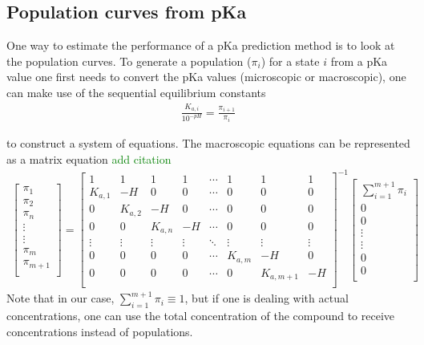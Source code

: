 \documentclass[9pt,lineno,final]{elife}
\begin{document}
\subsection{Population curves from pKa}
One way to estimate the performance of a pKa prediction method is to look at the population curves.
%
To generate a population ($\pi_i$) for a state $i$ from a pKa value one first needs to convert the pKa values (microscopic or macroscopic), one can make use of the sequential equilibrium constants 
%
\begin{align}
 \frac{K_{a,i}}{10^{-pH}} = \frac{\pi_{i+1}}{\pi_{i}}
\end{align}

to construct a system of equations. The macroscopic equations can be represented as a matrix equation \textcolor{green}{add citation}
%
\begin{gather}
\begin{bmatrix} \pi_{1} \\ \pi_{2} \\ \pi_{n} \\ \vdots \\ \vdots \\ \pi_{m} \\ \pi_{m+1}\\ \end{bmatrix}
=
\begin{bmatrix}
 1       & 1       & 1       & 1       & \cdots    & 1& 1  & 1 \\
 K_{a,1} & -H      & 0       & 0       & \cdots    & 0&0  & 0 \\
 0       & K_{a,2} & -H      & 0       & \cdots    & 0&0  & 0 \\
 0       & 0       & K_{a,n} & -H      & \cdots    & 0&0  & 0 \\  
 \vdots  & \vdots  & \vdots  & \vdots  & \ddots    & \vdots & \vdots  & \vdots \\
 0       & 0       & 0       & 0       & \cdots    & K_{a,m} & -H & 0 \\  
 0       & 0       & 0       & 0       & \cdots    &         0    & K_{a,m+1}   & -H \\
\end{bmatrix}^{-1}
\begin{bmatrix} \sum_{i=1}^{m+1} \pi_i \\ 0 \\ 0 \\ \vdots \\ \vdots \\ 0 \\ 0\\ \end{bmatrix}
\end{gather}
%
Note that in our case, $\sum\limits_{i=1}^{m+1} \pi_i \equiv 1$, but if one is dealing with actual concentrations, one can use the total concentration of the compound to receive concentrations instead of populations.
\end{document}
